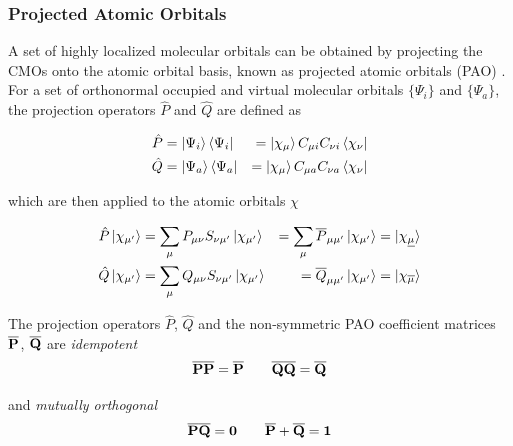 
\subsubsection{Projected Atomic Orbitals \label{sec:PAO}}

A set of highly localized molecular orbitals can be obtained by projecting the CMOs onto the atomic orbital basis, known as projected atomic orbitals (PAO) \cite{Sae1993}. For a set of orthonormal occupied and virtual molecular orbitals $\{\Psi_i\}$ and $\{\Psi_a\}$, the projection operators $\hat{P}$ and $\hat{Q}$ are defined as \cite{Chr2006}

\begin{eqnarray}
\hat{P} &= \ket{\smash{\Psi_i}} \bra{\smash{\Psi_i}} &= \ket{\smash{\chi_{\mu}}} C_{\mu i} C_{\nu i} \bra{\chi_{\nu}} \\
\hat{Q} &= \ket{\smash{\Psi_a}} \bra{\smash{\Psi_a}} &= \ket{\smash{\chi_{\mu}}} C_{\mu a} C_{\nu a} \bra{\smash{\chi_{\nu}}}
\end{eqnarray}

\noindent which are then applied to the atomic orbitals $\chi$ 

\begin{eqnarray}
\hat{P} \ket{\smash{\chi_{\mu'}}} &= \sum_{\mu} P_{\mu\nu} S_{\nu\mu'} \ket{\smash{\chi_{\mu'}}} &= \sum_{\mu} \overline{P}_{\mu \mu'} \ket{\smash{\chi_{\mu'}}} = \ket{\smash{\chi_{\underline{\mu}}}} \\
\hat{Q} \ket{\smash{\chi_{\mu'}}} &= \sum_{\mu} Q_{\mu\nu} S_{\nu\mu'} \ket{\smash{\chi_{\mu'}}}  &= \overline{Q}_{\mu \mu'} \ket{\smash{\chi_{\mu'}}} = \ket{\smash{\chi_{\overline{\mu}}}}
\end{eqnarray} 

The projection operators $\hat{P}$, $\hat{Q}$ and the non-symmetric PAO coefficient matrices $\mathbf{\overline{P}}$, $\mathbf{\overline{Q}}$ are \emph{idempotent}
\begin{equation}
\mathbf{\overline{P}}\mathbf{\overline{P}} = \mathbf{\overline{P}} \qquad
\mathbf{\overline{Q}}\mathbf{\overline{Q}} = \mathbf{\overline{Q}}
\end{equation}

\noindent and \emph{mutually orthogonal} 
\begin{equation}
\mathbf{\overline{P}}\mathbf{\overline{Q}} = \mathbf{0} \qquad \mathbf{\overline{P}} + \mathbf{\overline{Q}} = \mathbf{1} 
\end{equation} 

